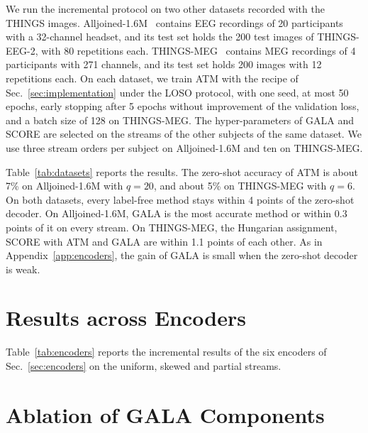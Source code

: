 \documentclass[10pt,twocolumn,letterpaper]{article}
\begin{document}
We run the incremental protocol on two other datasets recorded with the THINGS images. Alljoined-1.6M~\cite{xu2025alljoined} contains EEG recordings of 20 participants with a 32-channel headset, and its test set holds the 200 test images of THINGS-EEG-2, with 80 repetitions each. THINGS-MEG~\cite{hebart2023thingsdata} contains MEG recordings of 4 participants with 271 channels, and its test set holds 200 images with 12 repetitions each. On each dataset, we train ATM with the recipe of Sec.~\ref{sec:implementation} under the LOSO protocol, with one seed, at most 50 epochs, early stopping after 5 epochs without improvement of the validation loss, and a batch size of 128 on THINGS-MEG. The hyper-parameters of GALA and SCORE are selected on the streams of the other subjects of the same dataset. We use three stream orders per subject on Alljoined-1.6M and ten on THINGS-MEG.

Table~\ref{tab:datasets} reports the results. The zero-shot accuracy of ATM is about 7\% on Alljoined-1.6M with $q=20$, and about 5\% on THINGS-MEG with $q=6$. On both datasets, every label-free method stays within 4 points of the zero-shot decoder. On Alljoined-1.6M, GALA is the most accurate method or within 0.3 points of it on every stream. On THINGS-MEG, the Hungarian assignment, SCORE with ATM and GALA are within 1.1 points of each other. As in Appendix~\ref{app:encoders}, the gain of GALA is small when the zero-shot decoder is weak.


\section{Results across Encoders}
\label{app:enc-tables}

Table~\ref{tab:encoders} reports the incremental results of the six encoders of Sec.~\ref{sec:encoders} on the uniform, skewed and partial streams.

\section{Ablation of GALA Components}
\label{app:ablation}
\end{document}
